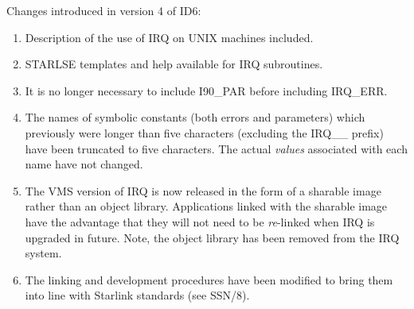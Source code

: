 Changes introduced in version 4 of ID6:
\begin {enumerate}
\item Description of the use of IRQ on UNIX machines included.
\item STARLSE templates and help available for IRQ subroutines.
\item It is no longer necessary to include I90\_PAR before including
IRQ\_ERR.
\item The names of symbolic constants (both errors and parameters) which previously
were longer than five characters (excluding the IRQ\_\_ prefix) have been
truncated to five characters. The actual {\em values} associated with each name
have not changed.
\item The VMS version of IRQ is now released in the form of a sharable image
rather than an object library. Applications linked with the sharable image have
the advantage that they will not need to be {\em re}-linked when IRQ is upgraded
in future. Note, the object library has been removed from the IRQ system.
\item The linking and development procedures have been modified to bring them
into line with Starlink standards (see SSN/8).

\end {enumerate}


